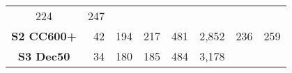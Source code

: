 \begin{longtable}[]{@{}crrrrrrr@{}}
\begin{minipage}[t]{0.07\columnwidth}
224\strut
\end{minipage} & \begin{minipage}[t]{0.14\columnwidth}\raggedleft\strut
247\strut
\end{minipage}\tabularnewline
\begin{minipage}[t]{0.12\columnwidth}\centering\strut
\textbf{S2 CC600+}\strut
\end{minipage} & \begin{minipage}[t]{0.10\columnwidth}\raggedleft\strut
42\strut
\end{minipage} & \begin{minipage}[t]{0.06\columnwidth}\raggedleft\strut
194\strut
\end{minipage} & \begin{minipage}[t]{0.13\columnwidth}\raggedleft\strut
217\strut
\end{minipage} & \begin{minipage}[t]{0.07\columnwidth}\raggedleft\strut
481\strut
\end{minipage} & \begin{minipage}[t]{0.09\columnwidth}\raggedleft\strut
2,852\strut
\end{minipage} & \begin{minipage}[t]{0.07\columnwidth}\raggedleft\strut
236\strut
\end{minipage} & \begin{minipage}[t]{0.14\columnwidth}\raggedleft\strut
259\strut
\end{minipage}\tabularnewline
\begin{minipage}[t]{0.12\columnwidth}\centering\strut
\textbf{S3 Dec50}\strut
\end{minipage} & \begin{minipage}[t]{0.10\columnwidth}\raggedleft\strut
34\strut
\end{minipage} & \begin{minipage}[t]{0.06\columnwidth}\raggedleft\strut
180\strut
\end{minipage} & \begin{minipage}[t]{0.13\columnwidth}\raggedleft\strut
185\strut
\end{minipage} & \begin{minipage}[t]{0.07\columnwidth}\raggedleft\strut
484\strut
\end{minipage} & \begin{minipage}[t]{0.09\columnwidth}\raggedleft\strut
3,178\strut
\end{minipage} & \begin{minipage}[t]{0.07\columnwidth}\raggedleft\strut

\end{minipage}
\end{longtable}
